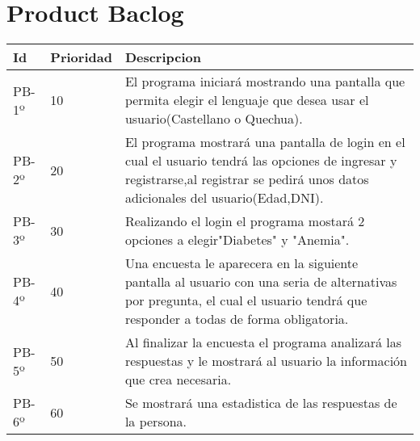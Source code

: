 \chapter{Product Baclog}



\begin{table}[htbp]
	\begin{center}
		\begin{tabular}{| p{2.1cm}| p{2.1cm} |p{8.2cm} |}
			\hline
			\textbf{Id} & \textbf {Prioridad} & \textbf{Descripcion} \\\hline    
			PB-1º & 10 & El programa iniciará mostrando una pantalla que permita elegir el lenguaje que desea usar el usuario(Castellano o Quechua).\\ \hline
			PB-2º & 20 & El programa mostrará una pantalla de login en el cual el usuario tendrá las opciones de ingresar y registrarse,al registrar se pedirá unos datos adicionales del usuario(Edad,DNI).\\ \hline
			PB-3º & 30 & Realizando el login el programa mostará 2 opciones a elegir"Diabetes" y "Anemia".\\ \hline
			PB-4º & 40 & Una encuesta le aparecera en la siguiente pantalla al usuario con una seria de alternativas por pregunta, 
			el cual el usuario tendrá que responder a todas de forma obligatoria.\\ \hline
			PB-5º & 50 & Al finalizar la encuesta el programa analizará las respuestas y le mostrará al usuario la información que crea necesaria.\\ \hline
			PB-6º & 60 & Se mostrará una estadistica de las respuestas de la persona.\\ \hline
		\end{tabular}
	\end{center}
\end{table}

